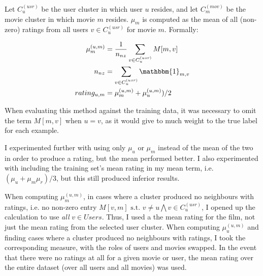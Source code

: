 \documentclass{article}
\begin{document}
    Let $C^{(usr)}_u$ be the user cluster in which user $u$ resides, and let $C^{(mov)}_m$ be the movie cluster in which movie $m$ resides. $\mu_m$ is computed as the mean of all (non-zero) ratings from all users $v \in C^{(usr)}_u$ for movie $m$. Formally:
    
    \begin{align*}
\mu^{(u,m)}_m &= \frac{1}{ n_{nz} } \sum_{ v \in  C^{(usr)}_u} M[m,v]\\
n_{nz} &= \sum_{ v \in  C^{(usr)}_u} \mathbbm{1}_{m,v} \\
rating_{u,m} &= \mu^{(u,m)}_m + \mu^{(u,m)}_u) / 2
    \end{align*}

    When evaluating this method against the training data, it was necessary to omit the term $M[m,v]$ when $u = v$, as it would give to much weight to the true label for each example.
    
    I experimented further with using only $\mu_u$ or $\mu_m$ instead of the mean of the two in order to produce a rating, but the mean performed better. I also experimented with including the training set's mean rating in my mean term, i.e. $(\mu_u + \mu_m \mu_r)/3$, but this still produced inferior results.
    
    When computing $\mu^{(u,m)}_m$, in cases where a cluster produced no neighbours with ratings, i.e. no non-zero entry $M[v,m] \text{ s.t. } v \ne u \bigwedge v \in C^{(usr)}_u$, I opened up the calculation to use \textit{all} $v \in Users$. Thus, I used a the mean rating for the film, not just the mean rating from the selected user cluster. When computing $\mu^{(u,m)}_u$ and finding cases where a cluster produced no neighbours with ratings, I took the corresponding measure, with the roles of users and movies swapped. In the event that there were no ratings at all for a given movie or user, the mean rating over the entire dataset (over all users and all movies) was used.
\end{document}
